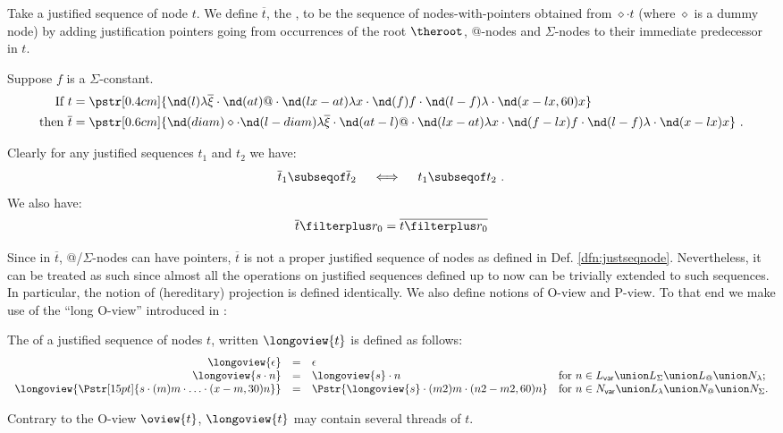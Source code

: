 Take a justified sequence of node $t$. We define $\overline{t}$, the ,
to be the sequence of nodes-with-pointers obtained from $\diamond \cdot t$ (where
$\diamond$ is a dummy node) by adding justification pointers going
from occurrences of the root $\theroot$, @-nodes and $\Sigma$-nodes
to their immediate predecessor in $t$.
\begin{example} Suppose $f$ is a $\Sigma$-constant.
\begin{align*}
\mbox{If }  t &= \pstr[0.4cm]{ \nd(l){\lambda \overline{\xi}} \cdot \nd(at)@ \cdot \nd(lx-at){\lambda x}\cdot   \nd(f)f \cdot \nd(l-f){\lambda} \cdot \nd(x-lx,60)x} \\
\mbox{then }  \overline{t} &= \pstr[0.6cm]{ \nd(diam)\diamond \cdot \nd(l-diam){\lambda \overline{\xi}}
 \cdot  \nd(at-l)@\cdot  \nd(lx-at){\lambda x}\cdot
\nd(f-lx)f\cdot \nd(l-f){\lambda}\cdot \nd(x-lx)x}\ .
\end{align*}
\end{example}

Clearly for any justified sequences $t_1$ and $t_2$ we have:
\begin{equation}
 \overline{t}_1 \subseqof  \overline{t}_2 \quad \iff \quad t_1 \subseqof  t_2 \label{eqn:hat_subseq} \ .
\end{equation}
We also have:
\begin{equation}
 \overline{t} \filterplus r_0 = \overline{t \filterplus r_0} \label{eqn:barprojplus_eq_projplusbar}
\end{equation}



Since in $\overline{t}$, @/$\Sigma$-nodes can have pointers,
$\overline{t}$ is not a proper justified sequence of nodes as
defined in Def. \ref{dfn:justseqnode}. Nevertheless, it can be
treated as such since almost all the operations on justified
sequences defined up to now can be trivially extended to such
sequences. In particular, the notion of (hereditary) projection is
defined identically. We also define notions of O-view and P-view. To
that end we make use of the ``long O-view'' introduced in
\cite{Harmer2005}:
\begin{definition}
The  of a justified sequence of nodes $t$,
written $\longoview{t}$ is defined as follows:
$$\begin{array}{rcll}
 \longoview{\epsilon} &=&  \epsilon \\
 \longoview{s \cdot n }  &=&  \longoview{s} \cdot n
    & \mbox{for $n \in L_{\sf var} \union L_\Sigma \union L_@ \union N_\lambda$;}
    \\
 \longoview{\Pstr[15pt]{s \cdot (m){m} \cdot \ldots \cdot (x-m,30){n}}} &=&
    \Pstr{ \longoview{s} \cdot (m2){m} \cdot (n2-m2,60){n} }
    & \mbox{for $n \in N_{\sf var} \union L_\lambda \union N_@ \union N_\Sigma$.}
\end{array}$$
\end{definition}
Contrary to the O-view $\oview{t}$, $\longoview{t}$ may contain
several threads of $t$.

